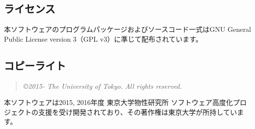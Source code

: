 \subsection{ライセンス}
本ソフトウェアのプログラムパッケージおよびソースコード一式はGNU General Public License version 3（GPL v3）に準じて配布されています。

\subsection{コピーライト}
\begin{quote}
{\it \copyright  2015- The University of Tokyo.} {\it All rights reserved.}
\end{quote}
本ソフトウェアは2015, 2016年度 東京大学物性研究所 ソフトウェア高度化プロジェクトの支援を受け開発されており、その著作権は東京大学が所持しています。

